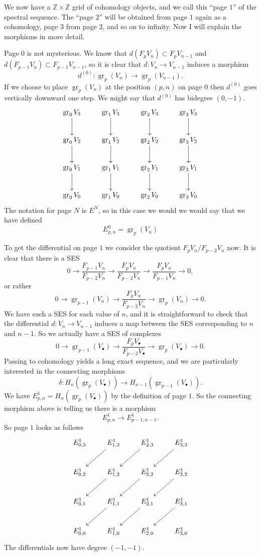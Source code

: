 \documentclass[12pt]{article}
\theoremstyle{plain}
\theoremstyle{definition}
\numberwithin{equation}{section}
\DeclareMathOperator{\gr}{gr}
\newcommand{\Z}{\mathbb{Z}}
\begin{document}
We now have a $\Z \times \Z$ grid of cohomology objects, and we call this ``page $1$'' of the spectral sequence. The ``page $2$'' will be obtained from page $1$ again as a cohomology, page $3$ from page $2$, and so on to infinity. Now I will explain the morphisms in more detail.

Page $0$ is not mysterious. We know that $d(F_pV_n) \subset F_pV_{n-1}$ and $d(F_{p-1}V_n) \subset F_{p-1}V_{n-1}$, so it is clear that $d : V_n \rightarrow V_{n-1}$ induces a morphism
\[
 d^{(0)} : \gr_p(V_n) \rightarrow \gr_p(V_{n-1}).
\]
If we choose to place $\gr_p(V_n)$ at the position $(p, n)$ on page $0$ then $d^{(0)}$ goes vertically downward one step. We might say that $d^{(0)}$ has bidegree $(0, -1)$.
\begin{align*}
\xymatrix{
\gr_0V_3 \ar@{->}[d] & \gr_1V_3 \ar@{->}[d] & \gr_2V_3 \ar@{->}[d] & \gr_3V_3 \ar@{->}[d] \\
%
\gr_0V_2 \ar@{->}[d] & \gr_1V_2 \ar@{->}[d] & \gr_2V_2 \ar@{->}[d] & \gr_3V_2 \ar@{->}[d] \\
%
\gr_0V_1 \ar@{->}[d] & \gr_1V_1 \ar@{->}[d] & \gr_2V_1 \ar@{->}[d] & \gr_3V_1 \ar@{->}[d] \\
%
\gr_0V_0  & \gr_1V_0  & \gr_2V_0  & \gr_3V_0  \\
}
\end{align*}
The notation for page $N$ is $E^N$, so in this case we would we would say that we have defined
\[
E^0_{p, n} = \gr_p(V_n)
\]

To get the differential on page $1$ we consider the quotient $F_pV_n / F_{p-2}V_n$ now. It is clear that there is a SES
\[
0 \rightarrow \frac{F_{p-1}V_n}{F_{p-2}V_n} \rightarrow \frac{F_pV_n}{F_{p-2}V_n} \rightarrow \frac{F_pV_n}{F_{p-1}V_n} \rightarrow 0,
\]
or rather
\[
0 \rightarrow \gr_{p-1}(V_n) \rightarrow \frac{F_pV_n}{F_{p-2}V_n} \rightarrow \gr_{p}(V_n) \rightarrow 0.
\]
We have such a SES for each value of $n$, and it is straightforward to check that the differential $d : V_n \rightarrow V_{n-1}$ induces a  map between the SES corresponding to $n$ and $n-1$. So we actually have a SES of complexes
\[
0 \rightarrow \gr_{p-1}(V_\bullet) \rightarrow \frac{F_pV_\bullet}{F_{p-2}V_\bullet} \rightarrow \gr_{p}(V_\bullet) \rightarrow 0.
\]
Passing to cohomology yields a long exact sequence, and we are particularly interested in the connecting morphisms
\[
\delta : H_n(\gr_{p}(V_\bullet)) \rightarrow H_{n-1}(\gr_{p-1}(V_\bullet)).
\]
We have $E^1_{p, n} = H_n(\gr_{p}(V_\bullet))$ by the definition of page $1$. So the connecting morphism above is telling us there is a morphism
\[
E^1_{p, n} \rightarrow E^1_{p-1, n-1}.
\]
So page $1$ looks as follows
\begin{align*}
\xymatrix{
E^1_{0, 3} & E^1_{1, 3} \ar@{->}[dl] & E^1_{2, 3} \ar@{->}[dl] & E^1_{3, 3} \ar@{->}[dl] \\
%
E^1_{0, 2} & E^1_{1, 2} \ar@{->}[dl] & E^1_{2, 2} \ar@{->}[dl] & E^1_{3, 2} \ar@{->}[dl] \\
%
E^1_{0, 1} & E^1_{1, 1} \ar@{->}[dl] & E^1_{2, 1} \ar@{->}[dl] & E^1_{3, 1} \ar@{->}[dl] \\
%
E^1_{0, 0} & E^1_{1, 0}  & E^1_{2, 0}  & E^1_{3, 0}  \\
}
\end{align*}
The differentials now have degree $(-1, -1)$.
\end{document}
